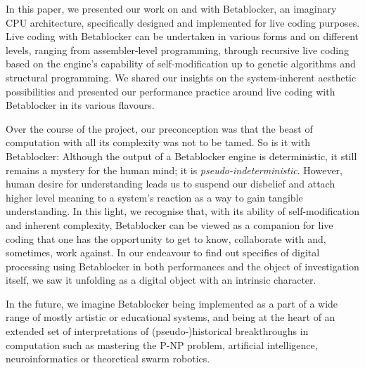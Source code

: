 \documentclass[letterpaper, 12pt]{article}
\begin{document}
In this paper, we presented our work on and with Betablocker, an imaginary CPU architecture, specifically designed and implemented for live coding purposes.
Live coding with Betablocker can be undertaken in various forms and on different levels, ranging from assembler-level programming, through recursive live coding based on the engine's capability of self-modification up to genetic algorithms and structural programming.
We shared our insights on the system-inherent aesthetic possibilities and presented our performance practice around live coding with Betablocker in its various flavours.

Over the course of the project, our preconception was that the beast of computation with all its complexity was not to be tamed.
So is it with Betablocker: Although the output of a Betablocker engine is deterministic, it still remains a mystery for the human mind; it is \emph{pseudo-indeterministic}.
However, human desire for understanding leads us to suspend our disbelief and attach higher level meaning to a system's reaction as a way to gain tangible understanding.
In this light, we recognise that, with its ability of self-modification and inherent complexity, Betablocker can be viewed as a companion for live coding that one has the opportunity to get to know, collaborate with and, sometimes, work against.
In our endeavour to find out specifics of digital processing using Betablocker in both performances and the object of investigation itself, we saw it unfolding as a digital object with an intrinsic character.

In the future, we imagine Betablocker being implemented as a part of a wide range of mostly artistic or educational systems, and being at the heart of an extended set of interpretations of (pseudo-)historical breakthroughs in computation such as mastering the P-NP problem, artificial intelligence, neuroinformatics or theoretical swarm robotics.
\parskip 18pt




% 

\end{document}

